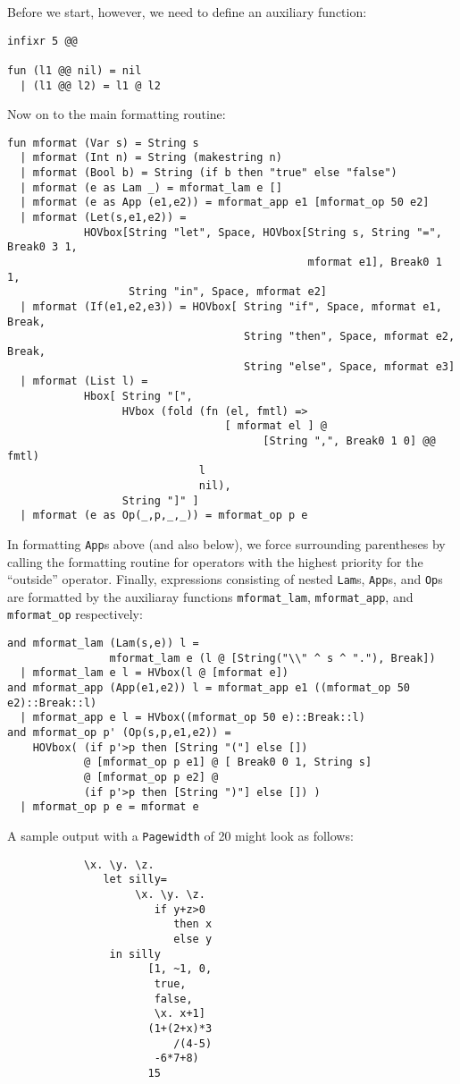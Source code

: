 Before we start, however, we need to define an auxiliary function:
\begin{verbatim}
infixr 5 @@

fun (l1 @@ nil) = nil
  | (l1 @@ l2) = l1 @ l2
\end{verbatim}
Now on to the main formatting routine:
\begin{verbatim}
fun mformat (Var s) = String s
  | mformat (Int n) = String (makestring n)
  | mformat (Bool b) = String (if b then "true" else "false")
  | mformat (e as Lam _) = mformat_lam e []
  | mformat (e as App (e1,e2)) = mformat_app e1 [mformat_op 50 e2]
  | mformat (Let(s,e1,e2)) =
            HOVbox[String "let", Space, HOVbox[String s, String "=", Break0 3 1,
                                               mformat e1], Break0 1 1,
                   String "in", Space, mformat e2]
  | mformat (If(e1,e2,e3)) = HOVbox[ String "if", Space, mformat e1, Break,
                                     String "then", Space, mformat e2, Break,
                                     String "else", Space, mformat e3]
  | mformat (List l) =
            Hbox[ String "[",
                  HVbox (fold (fn (el, fmtl) =>
                                  [ mformat el ] @
                                        [String ",", Break0 1 0] @@ fmtl)
                              l
                              nil),
                  String "]" ]
  | mformat (e as Op(_,p,_,_)) = mformat_op p e
\end{verbatim}
In formatting {\tt App}s above (and also below), we force surrounding
parentheses by calling the formatting routine for operators with the
highest priority for the ``outside'' operator.
Finally, expressions consisting of nested {\tt Lam}s, {\tt App}s, 
and {\tt Op}s are
formatted by the auxiliaray functions
{\tt mformat\_lam}, {\tt mformat\_app}, and {\tt mformat\_op}
respectively:
\begin{verbatim}
and mformat_lam (Lam(s,e)) l =
                mformat_lam e (l @ [String("\\" ^ s ^ "."), Break])
  | mformat_lam e l = HVbox(l @ [mformat e])
and mformat_app (App(e1,e2)) l = mformat_app e1 ((mformat_op 50 e2)::Break::l)
  | mformat_app e l = HVbox((mformat_op 50 e)::Break::l)
and mformat_op p' (Op(s,p,e1,e2)) =
    HOVbox( (if p'>p then [String "("] else [])
            @ [mformat_op p e1] @ [ Break0 0 1, String s]
            @ [mformat_op p e2] @
            (if p'>p then [String ")"] else []) )
  | mformat_op p e = mformat e
\end{verbatim}
A sample output with a {\tt Pagewidth} of 20 might look as follows:
\begin{verbatim}
            \x. \y. \z.
               let silly=
                    \x. \y. \z.
                       if y+z>0
                          then x
                          else y
                in silly
                      [1, ~1, 0,
                       true,
                       false,
                       \x. x+1]
                      (1+(2+x)*3
                          /(4-5)
                       -6*7+8)
                      15
\end{verbatim}





